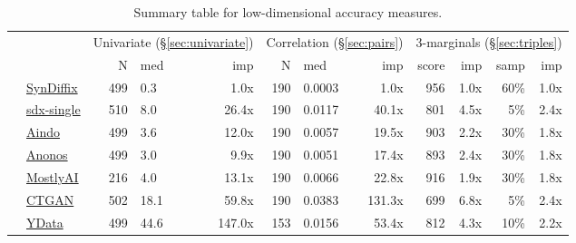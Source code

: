 \begin{table}
    \centering
    \caption{Summary table for low-dimensional accuracy measures.}
    \label{tab:accuracy}
    \begin{tabular}{llrlr@{\hskip 10pt}r@{\hskip 6pt}l@{\hskip 6pt}r@{\hskip 10pt}r@{\hskip 6pt}r@{\hskip 6pt}r@{\hskip 6pt}r}
        \toprule
          &   & \multicolumn{3}{c}{Univariate (\S\ref{sec:univariate})} & \multicolumn{3}{c}{Correlation (\S\ref{sec:pairs})} & \multicolumn{4}{c}{3-marginals (\S\ref{sec:triples})} \\
        
 & & N & med & imp & N & med & imp & score & imp & samp & imp \\
\midrule
        \cellcolor{blue} & \href{https://htmlpreview.github.io/?https://github.com/yoid2000/sdnist-summary/blob/main/results/syndiffix_all/report.html}{SynDiffix} & 499 & 0.3 & 1.0x & 190 & 0.0003 & 1.0x & 956 & 1.0x & 60\% & 1.0x \\
        \cellcolor{blue} & \href{https://htmlpreview.github.io/?https://github.com/yoid2000/sdnist-summary/blob/main/results/sdx_single/report.html}{sdx-single} & 510 & 8.0 & 26.4x & 190 & 0.0117 & 40.1x & 801 & 4.5x & 5\% & 2.4x \\
        \cellcolor{red} & \href{https://htmlpreview.github.io/?https://github.com/yoid2000/sdnist-summary/blob/main/results/aindo_synth/report.html}{Aindo} & 499 & 3.6 & 12.0x & 190 & 0.0057 & 19.5x & 903 & 2.2x & 30\% & 1.8x \\
        \cellcolor{red} & \href{https://htmlpreview.github.io/?https://github.com/yoid2000/sdnist-summary/blob/main/results/anonos_sdk/report.html}{Anonos} & 499 & 3.0 & 9.9x & 190 & 0.0051 & 17.4x & 893 & 2.4x & 30\% & 1.8x \\
        \cellcolor{red} & \href{https://htmlpreview.github.io/?https://github.com/yoid2000/sdnist-summary/blob/main/results/mostlyai_sd_platform/report.html}{MostlyAI} & 216 & 4.0 & 13.1x & 190 & 0.0066 & 22.8x & 916 & 1.9x & 30\% & 1.8x \\
        \cellcolor{red} & \href{https://htmlpreview.github.io/?https://github.com/yoid2000/sdnist-summary/blob/main/results/sdv_ctgan_epochs1000/report.html}{CTGAN} & 502 & 18.1 & 59.8x & 190 & 0.0383 & 131.3x & 699 & 6.8x & 5\% & 2.4x \\
        \cellcolor{pink} & \href{https://htmlpreview.github.io/?https://github.com/yoid2000/sdnist-summary/blob/main/results/ydata_fabric_synthesizers/report.html}{YData} & 499 & 44.6 & 147.0x & 153 & 0.0156 & 53.4x & 812 & 4.3x & 10\% & 2.2x \\

\end{tabular}
\end{table}
